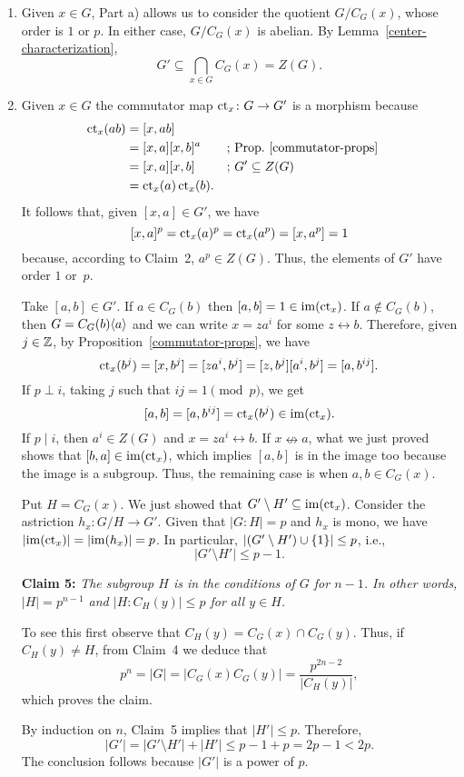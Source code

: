 \begin{solution}
\begin{enumerate}[\rm a)]
    \item Given $x\in G$, Part a) allows us to consider the quotient $G/C_G(x)$, whose order is $1$ or $p$. In either case, $G/C_G(x)$ is abelian. By Lemma~\ref{center-characterization},
    $$
        G' \subseteq\bigcap_{x\in G}C_G(x) = Z(G).
    $$

    \item Given $x\in G$ the commutator map $\operatorname{\operatorname{ct}}_x\colon G\to G'$ is a morphism because
    \begin{align*}
        \operatorname{\operatorname{ct}}_x(ab) &= [x,ab]\\
            &= [x,a][x,b]^a  &&\text{; Prop.~\ref{commutator-props}}\\
            &= [x,a][x,b]   &&\text{; }G'\subseteq Z(G)\\
            &= \operatorname{\operatorname{ct}}_x(a)\operatorname{\operatorname{ct}}_x(b).
    \end{align*}
    It follows that, given $[x,a]\in G'$, we have
    $$
        [x,a]^p = \operatorname{\operatorname{ct}}_x(a)^p = \operatorname{\operatorname{ct}}_x(a^p)=[x,a^p]=1
    $$
    because, according to Claim~2, $a^p\in Z(G)$. Thus, the elements of $G'$ have order $1$ or~$p$.

    Take $[a,b]\in G'$. If $a\in C_G(b)$ then $[a,b]=1\in\operatorname{im}(\operatorname{\operatorname{ct}}_x)$. If $a\notin C_G(b)$, then $G=C_G(b)\langle a\rangle$ and we can write $x=za^i$ for some $z\leftrightarrow b$. Therefore, given $j\in\mathbb{Z}$, by Proposition~\ref{commutator-props}, we have
    $$
        \operatorname{\operatorname{ct}}_x(b^j) = [x,b^j] = [za^i,b^j] = [z,b^j][a^i,b^j]= [a,b^{ij}].
    $$
    If $p\perp i$, taking $j$ such that $ij=1\pmod p$, we get
    $$
        [a,b]=[a,b^{ij}]=\operatorname{\operatorname{ct}}_x(b^j)\in\operatorname{im}(\operatorname{\operatorname{ct}}_x).
    $$
    If $p\mid i$, then $a^i\in Z(G)$ and $x=za^i\leftrightarrow b$. If $x\nleftrightarrow a$, what we just proved shows that $[b,a]\in\operatorname{im}(\operatorname{\operatorname{ct}}_x)$, which implies $[a,b]$ is in the image too because the image is a subgroup. Thus, the remaining case is when $a,b\in C_G(x)$.
    
    Put $H=C_G(x)$. We just showed that $G'\setminus H'\subseteq\operatorname{im}(\operatorname{\operatorname{ct}}_x)$. Consider the astriction $h_x\colon G/H\to G'$. Given that $|G:H|=p$ and $h_x$ is mono, we have $|{\operatorname{im}(\operatorname{\operatorname{ct}}_x)}|=|{\operatorname{im}(h_x)}|=p$. In particular, $|(G' \setminus H')\cup\{1\}|\le p$, i.e.,
    $$
        |G'\setminus H'|\le p-1.
    $$

    \textbf{Claim 5:} \textit{The subgroup\/ $H$ is in the conditions of\/ $G$ for $n-1$. In other words, $|H|=p^{n-1}$ and\/ $|H:C_H(y)|\le p$ for all\/ $y\in H$.}

    To see this first observe that $C_H(y)=C_G(x)\cap C_G(y)$. Thus, if $C_H(y)\ne H$, from Claim~4 we deduce that
    $$
        p^n=|G|=|C_G(x)C_G(y)|=\frac{p^{2n-2}}{|C_H(y)|},
    $$
    which proves the claim.

    By induction on $n$, Claim~5 implies that $|H'|\le p$. Therefore,
    $$
        |G'|=|G'\setminus H'|+|H'|\le p-1 + p = 2p-1< 2p.
    $$
    The conclusion follows because $|G'|$ is a power of $p$.
\end{enumerate}
\end{solution}


